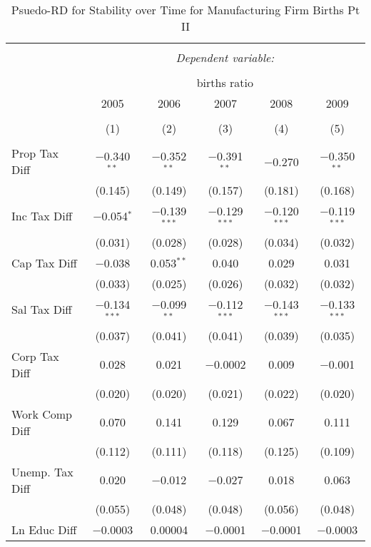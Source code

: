 
\begin{table}[!htbp] \centering 
  \caption{Psuedo-RD for Stability over Time for  Manufacturing Firm Births Pt II} 
  \label{31-33year} 
\small 
\begin{tabular}{@{\extracolsep{5pt}}lccccc} 
\\[-1.8ex]\hline 
\hline \\[-1.8ex] 
 & \multicolumn{5}{c}{\textit{Dependent variable:}} \\ 
\cline{2-6} 
\\[-1.8ex] & \multicolumn{5}{c}{births ratio} \\ 
 & 2005 & 2006 & 2007 & 2008 & 2009 \\ 
\\[-1.8ex] & (1) & (2) & (3) & (4) & (5)\\ 
\hline \\[-1.8ex] 
 Prop Tax Diff & $-$0.340$^{**}$ & $-$0.352$^{**}$ & $-$0.391$^{**}$ & $-$0.270 & $-$0.350$^{**}$ \\ 
  & (0.145) & (0.149) & (0.157) & (0.181) & (0.168) \\ 
  Inc Tax Diff & $-$0.054$^{*}$ & $-$0.139$^{***}$ & $-$0.129$^{***}$ & $-$0.120$^{***}$ & $-$0.119$^{***}$ \\ 
  & (0.031) & (0.028) & (0.028) & (0.034) & (0.032) \\ 
  Cap Tax Diff & $-$0.038 & 0.053$^{**}$ & 0.040 & 0.029 & 0.031 \\ 
  & (0.033) & (0.025) & (0.026) & (0.032) & (0.032) \\ 
  Sal Tax Diff & $-$0.134$^{***}$ & $-$0.099$^{**}$ & $-$0.112$^{***}$ & $-$0.143$^{***}$ & $-$0.133$^{***}$ \\ 
  & (0.037) & (0.041) & (0.041) & (0.039) & (0.035) \\ 
  Corp Tax Diff & 0.028 & 0.021 & $-$0.0002 & 0.009 & $-$0.001 \\ 
  & (0.020) & (0.020) & (0.021) & (0.022) & (0.020) \\ 
  Work Comp Diff & 0.070 & 0.141 & 0.129 & 0.067 & 0.111 \\ 
  & (0.112) & (0.111) & (0.118) & (0.125) & (0.109) \\ 
  Unemp. Tax Diff & 0.020 & $-$0.012 & $-$0.027 & 0.018 & 0.063 \\ 
  & (0.055) & (0.048) & (0.048) & (0.056) & (0.048) \\ 
  Ln Educ Diff & $-$0.0003 & 0.00004 & $-$0.0001 & $-$0.0001 & $-$0.0003 \\ 

\end{tabular}
\end{table}
